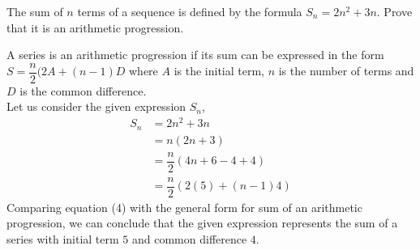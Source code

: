 
%
%
%
%
% 
% 

\question The sum of $n$ terms of a sequence is defined by the formula $S_n=2n^2+3n$. Prove that it is an arithmetic progression.

\insertQR{}

\ifprintanswers
\fi 

\begin{solution}
  A series is an arithmetic progression if its sum can be expressed in the form $S = \dfrac{n}{2}(2A + (n-1)D$ where $A$ is the initial term, $n$ is the number of terms and $D$ is the common difference. \\
  Let us consider the given expression $S_n$,
  \begin{align}
    S_n &= 2n^2 + 3n \\
        &= n(2n + 3) \\
        &= \dfrac{n}{2}(4n + 6 - 4 + 4) \\
        &= \dfrac{n}{2}(2(5) + (n-1)4)
  \end{align}
  Comparing equation (4) with the general form for sum of an arithmetic progression, we can conclude that the given expression represents the sum of a series with initial term $5$ and common difference $4$.
\end{solution}
